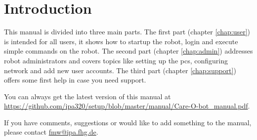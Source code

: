 \chapter{Introduction}
\label{chap:introduction} 

This manual is divided into three main parts. The first part (chapter \ref{chap:user}) is intended for all users, it shows how to startup the robot, login and execute simple commands on the robot. The second part (chapter \ref{chap:admin}) addresses robot administrators and covers topics like setting up the pcs, configuring network and add new user accounts. The third part (chapter \ref{chap:support}) offers some first help in case you need support.

You can always get the latest version of this manual at \url{https://github.com/ipa320/setup/blob/master/manual/Care-O-bot_manual.pdf}. 

If you have comments, suggestions or would like to add something to the manual, please contact \href{mailto:fmw@ipa.fhg.de}{fmw@ipa.fhg.de}.


